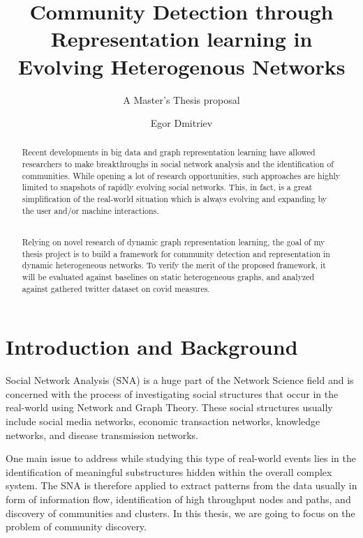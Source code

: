 \documentclass[
acmsmall,
nonacm,
screen,
acmthm]{../../scripts/pandoc/templates/acmart}
\title{Community Detection through Representation learning in Evolving
Heterogenous Networks}
\subtitle{A Master's Thesis proposal}
\author{Egor Dmitriev}
\affiliation{%
  \institution{Utrecht University}
  \country{The Netherlands}
}
\date{}
\begin{document}
\begin{abstract}
Recent developments in big data and graph representation learning have
allowed researchers to make breakthroughs in social network analysis and
the identification of communities. While opening a lot of research
opportunities, such approaches are highly limited to snapshots of
rapidly evolving social networks. This, in fact, is a great
simplification of the real-world situation which is always evolving and
expanding by the user and/or machine interactions.\\
\strut \\
Relying on novel research of dynamic graph representation learning, the
goal of my thesis project is to build a framework for community
detection and representation in dynamic heterogeneous networks. To
verify the merit of the proposed framework, it will be evaluated against
baselines on static heterogeneous graphs, and analyzed against gathered
twitter dataset on covid measures.
\end{abstract}
\maketitle



{
\setcounter{tocdepth}{2}
\tableofcontents
\pagebreak
}





\hypertarget{introduction-and-background}{%
\section{Introduction and
Background}\label{introduction-and-background}}

Social Network Analysis (SNA) is a huge part of the Network Science
field and is concerned with the process of investigating social
structures that occur in the real-world using Network and Graph Theory.
These social structures usually include social media networks, economic
transaction networks, knowledge networks, and disease transmission
networks.

One main issue to address while studying this type of real-world events
lies in the identification of meaningful substructures hidden within the
overall complex system. The SNA is therefore applied to extract patterns
from the data usually in form of information flow, identification of
high throughput nodes and paths, and discovery of communities and
clusters. In this thesis, we are going to focus on the problem of
community discovery.
\end{document}
